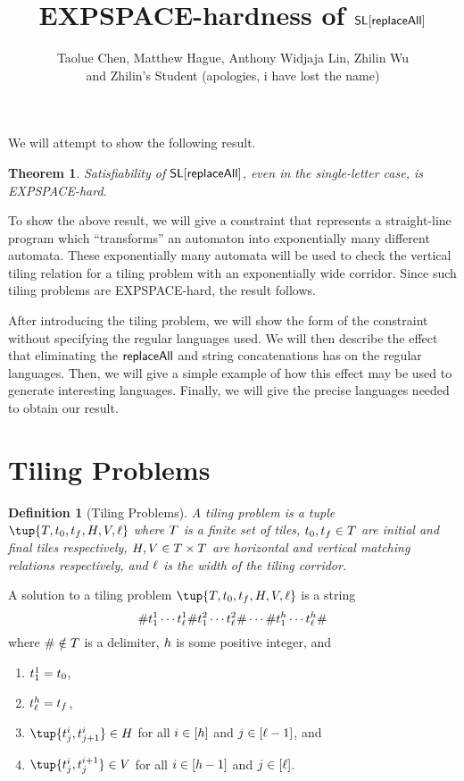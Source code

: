 \documentclass{article}
\title{EXPSPACE-hardness of $\mathsf{SL}[\mathsf{replaceAll}]$}
\author{Taolue Chen, Matthew Hague, Anthony Widjaja Lin, Zhilin Wu \\ and Zhilin's Student (apologies, i have lost the name)}
\date{}
\newtheorem{theorem}{Theorem}
\newtheorem{definition}{Definition}
\begin{document}
\maketitle

We will attempt to show the following result.

\begin{theorem}
    Satisfiability of $\mathsf{SL}[\mathsf{replaceAll}]$, even in the single-letter case, is EXPSPACE-hard.
\end{theorem}

To show the above result, we will give a constraint that represents a straight-line program which ``transforms'' an automaton into exponentially many different automata.
These exponentially many automata will be used to check the vertical tiling relation for a tiling problem with an exponentially wide corridor.
Since such tiling problems are EXPSPACE-hard, the result follows.

After introducing the tiling problem, we will show the form of the constraint without specifying the regular languages used.
We will then describe the effect that eliminating the $\mathsf{replaceAll}$ and string concatenations has on the regular languages.
Then, we will give a simple example of how this effect may be used to generate interesting languages.
Finally, we will give the precise languages needed to obtain our result.

\section{Tiling Problems}

\begin{definition}[Tiling Problems]
    A \emph{tiling problem} is a tuple
    $\tup{\tiles, \inittile, \fintile, \hcons, \vcons, \width}$
    where
        $T$ is a finite set of tiles,
        $t_0, t_f \in T$ are initial and final tiles respectively,
        $H, V \in T \times T$
            are horizontal and vertical matching relations respectively, and
        $\ell$ is the width of the tiling corridor.
\end{definition}

A solution to a tiling problem
$\tup{\tiles, \inittile, \fintile, \hcons, \vcons, \width}$
is a string
\[
    \# t^1_1 \cdots t^1_\ell
    \# t^2_1 \cdots t^2_\ell
    \# \cdots
    \# t^h_1 \cdots t^h_\ell
    \#
\]
where $\# \notin T$ is a delimiter, $h$ is some positive integer, and
\begin{enumerate}
\item
    $t^1_1 = t_0$,
\item
    $t^h_\ell = t_f$,
\item
    $\tup{\tile^i_j, \tile^i_{j+1}} \in \hcons$
    for all
    $i \in [h]$
    and
    $j \in [\ell - 1]$, and
\item
    $\tup{\tile^i_j, \tile^{i+1}_j} \in \vcons$
    for all
    $i \in [h - 1]$
    and
    $j \in [\ell]$.
\end{enumerate}
\end{document}
